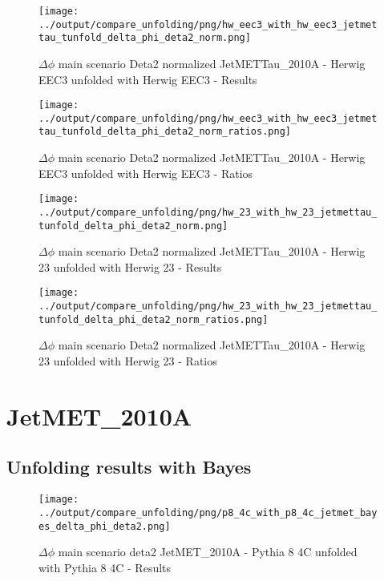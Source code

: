 \documentclass[11pt]{book}
\begin{document}
\begin{figure}[ht]
\centering
\texttt{[image: ../output/compare\_unfolding/png/hw\_eec3\_with\_hw\_eec3\_jetmettau\_tunfold\_delta\_phi\_deta2\_norm.png]}
\caption{$\Delta\phi$ main scenario Deta2 normalized JetMETTau\_2010A - Herwig EEC3 unfolded with Herwig EEC3 - Results}
\label{hw_eec3_hw_eec3_jetmettau_tunfold_delta_phi_deta2_norm_a}
\end{figure}

\begin{figure}[ht]
\centering
\texttt{[image: ../output/compare\_unfolding/png/hw\_eec3\_with\_hw\_eec3\_jetmettau\_tunfold\_delta\_phi\_deta2\_norm\_ratios.png]}
\caption{$\Delta\phi$ main scenario Deta2 normalized JetMETTau\_2010A - Herwig EEC3 unfolded with Herwig EEC3 - Ratios}
\label{hw_eec3_hw_eec3_jetmettau_tunfold_delta_phi_deta2_norm_b}
\end{figure}

\begin{figure}[ht]
\centering
\texttt{[image: ../output/compare\_unfolding/png/hw\_23\_with\_hw\_23\_jetmettau\_tunfold\_delta\_phi\_deta2\_norm.png]}
\caption{$\Delta\phi$ main scenario Deta2 normalized JetMETTau\_2010A - Herwig 23 unfolded with Herwig 23 - Results}
\label{hw_23_hw_23_jetmettau_tunfold_delta_phi_deta2_norm_a}
\end{figure}

\begin{figure}[ht]
\centering
\texttt{[image: ../output/compare\_unfolding/png/hw\_23\_with\_hw\_23\_jetmettau\_tunfold\_delta\_phi\_deta2\_norm\_ratios.png]}
\caption{$\Delta\phi$ main scenario Deta2 normalized JetMETTau\_2010A - Herwig 23 unfolded with Herwig 23 - Ratios}
\label{hw_23_hw_23_jetmettau_tunfold_delta_phi_deta2_norm_b}
\end{figure}


\clearpage
\section{JetMET\_2010A}
\subsection{Unfolding results with Bayes}

\begin{figure}[ht]
\centering
\texttt{[image: ../output/compare\_unfolding/png/p8\_4c\_with\_p8\_4c\_jetmet\_bayes\_delta\_phi\_deta2.png]}
\caption{$\Delta\phi$ main scenario deta2 JetMET\_2010A - Pythia 8 4C unfolded with Pythia 8 4C - Results}
\label{p8_p8_jetmet_bayes_delta_phi_deta2_a}
\end{figure}
\end{document}
